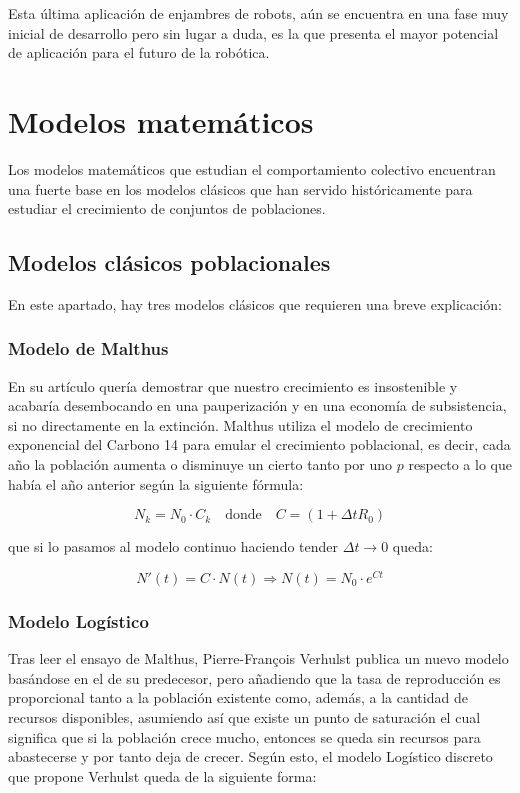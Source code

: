 Esta última aplicación de enjambres de robots, aún se encuentra en una fase muy inicial de desarrollo pero sin lugar a duda, es la que presenta el mayor potencial de aplicación para el futuro de la robótica.


\section{Modelos matemáticos} \label{s2_2}
Los modelos matemáticos que estudian el comportamiento colectivo encuentran una fuerte base en los modelos clásicos que han servido históricamente para estudiar el crecimiento de conjuntos de poblaciones.

\subsection{Modelos clásicos poblacionales} \label{s2_2_1}
En este apartado, hay tres modelos clásicos que requieren una breve explicación:

\subsubsection{Modelo de Malthus}
En su artículo \cite{malthus1846ensayo} quería demostrar que nuestro crecimiento es insostenible y acabaría desembocando en una pauperización y en una economía de subsistencia, si no directamente en la extinción. Malthus utiliza el modelo de crecimiento exponencial del Carbono 14 para emular el crecimiento poblacional, es decir, cada año la población aumenta o disminuye un cierto tanto por uno $p$ respecto a lo que había el año anterior según la siguiente fórmula:

\begin{equation}
    N_{k} = N_0\cdot C_k \quad \textrm{donde} \quad C = (1+\Delta tR_0)
\end{equation}

\noindent que si lo pasamos al modelo continuo haciendo tender $\Delta t \to 0$ queda:

\begin{equation}
    N'(t) = C \cdot N(t) \Rightarrow N(t) = N_0 \cdot e^{Ct}
\end{equation}

\subsubsection{Modelo Logístico}
Tras leer el ensayo de Malthus, Pierre-Fran\c{c}ois Verhulst \cite[Cap.~37,38]{haberman1998mathematical} publica un nuevo modelo basándose en el de su predecesor, pero añadiendo que la tasa de reproducción es proporcional tanto a la población existente como, además, a la cantidad de recursos disponibles, asumiendo así que existe un punto de saturación el cual significa que si la población crece mucho, entonces se queda sin recursos para abastecerse y por tanto deja de crecer. Según esto, el modelo Logístico discreto que propone Verhulst queda de la siguiente forma:

